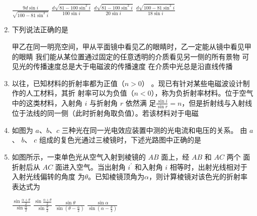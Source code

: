\begin{enumerate}
\fourchoices
{$\frac{9 d \sin i}{\sqrt{100-81 \sin ^{2} i}}$}
{$\frac{d \sqrt{81-100 \sin ^{2} i}}{100 \sin i}$}
{$\frac{d \sqrt{81-100 \sin ^{2} i}}{20 \sin i}$}
{$\frac{d \sqrt{100-81 \sin ^{2} i}}{18 \sin i}$}


\item 
{}
下列说法正确的是  

\fourchoices
{甲乙在同一明亮空间，甲从平面镜中看见乙的眼睛时，乙一定能从镜中看见甲的眼睛}
{我们能从某位置通过固定的任意透明的介质看见另一侧的所有景物}
{可见光的传播速度总是大于电磁波的传播速度}
{在介质中光总是沿直线传播}



\item
{}
以往，已知材料的折射率都为正值（$ n>0 $）
。现已有针对某些电磁波设计制作的人工材料，其折
射率可以为负值（$ n<0 $），称为负折射率材料。位于空气中的这类材料，入射角 $ i $ 与折射角 $ r $ 依然满
足$\frac{\sin i}{\sin r}=n$，但是折射线与入射线位于法线的同一侧（此时折射角取负值）。若该材料对于电磁  
\pfourchoices
{}
{}
{}
{}



\item 
{}
如图为 $ a $、$ b $、$ c $ 三种光在同一光电效应装置中测的光电流和电压的关系。
由 $ a $、 $ b $、 $ c $ 组成的复色光通过三棱镜时，下述光路图中正确的是  
\begin{figure}[h!]
	\centering
	
\end{figure}

\pfourchoices
{}
{}
{}
{}


\item 
{}
 如图所示，一束单色光从空气入射到棱镜的 $ AB $ 面上，经 $ AB $ 和 $ AC $ 两个
面折射后从 $ AC $ 面进入空气。当出射角 $ i ^{\prime}  $ 和入射角 $ i $ 相等时，出射光线相对于入射光线偏转的角度
为$ \theta $。已知棱镜顶角为$ \alpha $，则计算棱镜对该色光的折射率表达式为  
\begin{figure}[h!]
	\centering
	
\end{figure}

\fourchoices
{$\frac{\sin \frac{\alpha+\theta}{2}}{\sin \frac{\alpha}{2}}$}
{$\frac{\sin \frac{\alpha+\theta}{2}}{\sin \frac{\theta}{2}}$}
{$\frac{\sin \theta}{\sin \left(\theta-\frac{\alpha}{2}\right)}$}
{$\frac{\sin \alpha}{\sin \left(\alpha-\frac{\theta}{2}\right)}$}





	
	
	
\end{enumerate}

